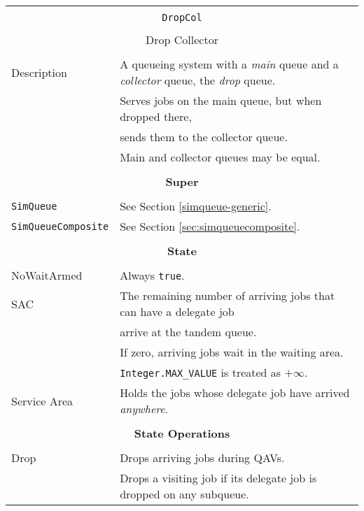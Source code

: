\begin{tabular}{|l|l|}
	\hline
	\multicolumn{2}{|c|}{} \\
	\multicolumn{2}{|c|}{\lstinline[basicstyle=\large]{DropCol}} \\
	\multicolumn{2}{|c|}{} \\
	\multicolumn{2}{|c|}{Drop Collector} \\
	\multicolumn{2}{|c|}{} \\
	\hline
	Description & A queueing system with a {\em main\/} queue
	and a {\em collector\/} queue, the {\em drop\/} queue.  \\
	&
	Serves jobs on the main queue, but when dropped there, \\
	& sends them to the collector queue.\\
	& Main and collector queues may be equal. \\
	\hline
	\multicolumn{2}{|c|}{} \\
	\multicolumn{2}{|c|}{\bf Super} \\
	\multicolumn{2}{|c|}{} \\
	\hline
	\lstinline|SimQueue| & See Section \ref{simqueue-generic}. \\
	\lstinline|SimQueueComposite| & See Section \ref{sec:simqueuecomposite}. \\
	\hline
	\multicolumn{2}{|c|}{} \\
	\multicolumn{2}{|c|}{\bf State} \\
	\multicolumn{2}{|c|}{} \\
	\hline
	NoWaitArmed & Always \lstinline|true|. \\
	\hline
	SAC & The remaining number of arriving jobs that can have a delegate job \\
	& arrive at the tandem queue. \\
	& If zero, arriving jobs wait in the waiting area. \\
	& \lstinline|Integer.MAX_VALUE| is treated as $+\infty$. \\
	\hline
	Service Area & Holds the jobs whose delegate job have arrived {\em anywhere}. \\
	\hline
	\multicolumn{2}{|c|}{} \\
	\multicolumn{2}{|c|}{\bf State Operations} \\
	\multicolumn{2}{|c|}{} \\
	\hline
	Drop & Drops arriving jobs during QAVs. \\
	& Drops a visiting job if its delegate job is dropped on any subqueue. \\

\end{tabular}
